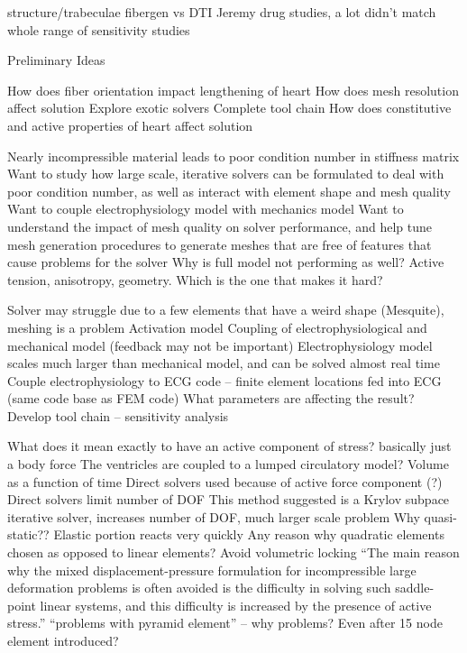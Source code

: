structure/trabeculae
fibergen vs DTI
Jeremy drug studies, a lot didn’t match
whole range of sensitivity studies



­Preliminary Ideas

How does fiber orientation impact lengthening of heart
How does mesh resolution affect solution
Explore exotic solvers
Complete tool chain
How does constitutive and active properties of heart affect solution


Nearly incompressible material leads to poor condition number in stiffness matrix
Want to study how large scale, iterative solvers can be formulated to deal with poor condition number, as well as interact with element shape and mesh quality
Want to couple electrophysiology model with mechanics model
Want to understand the impact of mesh quality on solver performance, and help tune mesh generation procedures to generate meshes that are free of features that cause problems for the solver
Why is full model not performing as well? Active tension, anisotropy, geometry. Which is the one that makes it hard?


Solver may struggle due to a few elements that have a weird shape (Mesquite), meshing is a problem
Activation model
Coupling of electrophysiological and mechanical model (feedback may not be important)
Electrophysiology model scales much larger than mechanical model, and can be solved almost real time
Couple electrophysiology to ECG code – finite element locations fed into ECG (same code base as FEM code)
What parameters are affecting the result?
Develop tool chain – sensitivity analysis





What does it mean exactly to have an active component of stress? basically just a body force
The ventricles are coupled to a lumped circulatory model? Volume as a function of time
Direct solvers used because of active force component (?)
Direct solvers limit number of DOF
This method suggested is a Krylov subpace iterative solver, increases number of DOF, much larger scale problem
 Why quasi-static?? Elastic portion reacts very quickly
Any reason why quadratic elements chosen as opposed to linear elements? Avoid volumetric locking
“The main reason why the mixed displacement-pressure formulation for incompressible large deformation problems is often avoided is the difficulty in solving such saddle-point linear systems, and this difficulty is increased by the presence of active stress.”
“problems with pyramid element” – why problems? Even after 15 node element introduced?


